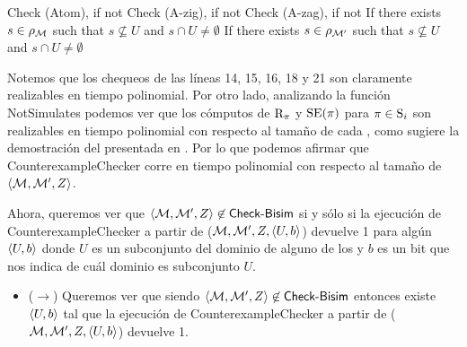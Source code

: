 \begin{demostracion}
\begin{algorithm}[t]
\begin{footnotesize}
\begin{algorithmic}[1]
            \vspace{1.5em}

                \State Check (Atom), if not 
                \State Check (A-zig), if not 
                \State Check (A-zag), if not 
                    \State If there exists $s \in \rho_\model$ such that $s \not\subseteq U$ and $s \cap U \neq \emptyset$ 
                    \State \Return {}
                \Else
                    \State If there exists $s \in \rho_{\model'}$ such that $s \not\subseteq U$ and $s \cap U \neq \emptyset$ 
                    \State \Return {} 
                \EndIf
            \EndFunction
        \end{algorithmic}
    \end{footnotesize}
    \end{algorithm}

    Notemos que los chequeos de las líneas 14, 15, 16, 18 y 21 son claramente realizables en tiempo polinomial. Por 
    otro lado, analizando la función \textsf{NotSimulates} podemos ver que los cómputos de $\R_\pi$ y $\sexec(\pi)$ 
    para $\pi \in \S_i$ son realizables en tiempo polinomial con respecto al tamaño de cada \ults, como sugiere la demostración del 
     presentada en \cite{ArecesFSV25,SaraviaPHD}. Por lo que podemos afirmar que 
    \textsf{CounterexampleChecker} corre en tiempo polinomial con respecto al tamaño de $\tup{\model,\model',Z}$.
    
    Ahora, queremos ver que $\tup{\modults,\modults',Z} \not\in \CBisim$ si y sólo si
    la ejecución de \textsf{CounterexampleChecker} a partir de ($\modults,\modults',Z,\tup{U,b}$) devuelve 1 para 
    algún $\tup{U,b}$ donde $U$ es un subconjunto del dominio de alguno de los \ults y $b$ es un 
    bit que nos indica de cuál dominio es subconjunto $U$.

    \begin{itemize}
        \item ($\rightarrow$) Queremos ver que siendo  
        $\tup{\modults,\modults',Z} \not \in \CBisim$ entonces
        existe $\tup{U,b}$ tal que la ejecución de \textsf{CounterexampleChecker} a partir de ($\modults,\modults',Z,\tup{U,b}$) 
        devuelve 1.


\end{itemize}
\end{demostracion}
